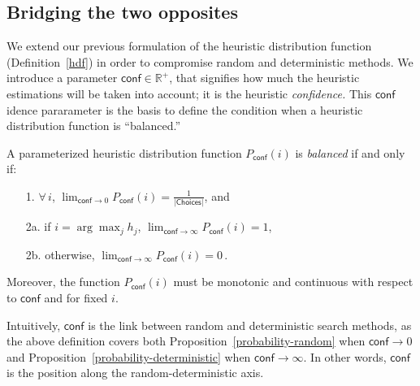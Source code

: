 \documentclass{ws-ijait}
\begin{document}
\subsection{Bridging the two opposites}

We extend our previous formulation of the heuristic
distribution function (Definition~\ref{hdf}) in order to
compromise random and deterministic methods. We introduce a
parameter $\mathsf{conf} \in \mathbb{R}^+$, that signifies
how much the heuristic estimations will be taken into
account; it is the heuristic \emph{confidence.} This
$\mathsf{conf}$idence pararameter is the basis to define the
condition when a heuristic distribution function is
``balanced.''
\begin{definition}
  \label{balanced}
  A parameterized heuristic distribution function
  $P_\mathsf{conf} (i)$ is \emph{balanced} if and only if:
  \begin{enumerate}
    \item[1.] $\forall \, i$, ${\displaystyle
              \lim_{\mathsf{conf} \to 0} } \!\!
              P_\mathsf{conf} (i) =
              \frac{1}{|\mathsf{Choices}|}$, and
    \item[2a.] if $i = \arg\max_j h_j$, ${\displaystyle
               \lim_{\mathsf{conf} \to \infty} } \!\!\!\!
               P_\mathsf{conf} (i) = 1$,
    \item[2b.] otherwise, ${\displaystyle
               \lim_{\mathsf{conf} \to \infty} } \!\!\!\!
               P_\mathsf{conf} (i) = 0 \,$.
  \end{enumerate}
  Moreover, the function $P_\mathsf{conf} (i)$ must be
  monotonic and continuous with respect to $\mathsf{conf}$
  and for fixed $i$.
\end{definition}
Intuitively, $\mathsf{conf}$ is the link between random and
deterministic search methods, as the above definition covers
both Proposition~\ref{probability-random} when
$\mathsf{conf} \to 0$ and
Proposition~\ref{probability-deterministic} when
$\mathsf{conf} \to \infty$. In other words, $\mathsf{conf}$
is the position along the random-deterministic axis.
\end{document}
